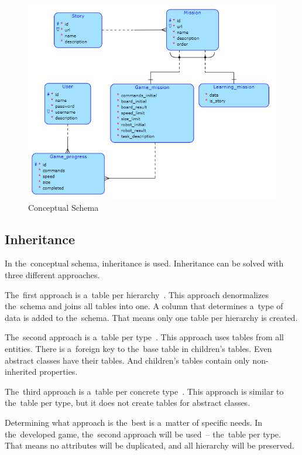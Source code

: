 \begin{figure}
    \centering
    \includegraphics[width=1\linewidth]{assets/design/conceptualdiagram.png}
    \caption{Conceptual Schema}
    \label{fig:design:conceptualschema}
\end{figure}

\subsection{Inheritance}

In the~conceptual schema, inheritance is used.
Inheritance can be solved with three different approaches.

The~first approach is a~table per hierarchy~\cite{a2010_enterprise}.
This approach denormalizes the~schema and joins all tables into one.
A column that determines a~type of data is added to the~schema.
That means only one table per hierarchy is created.

The~second approach is a~table per type~\cite{a2010_enterprise}.
This approach uses tables from all entities.
There is a~foreign key to the~base table in children's tables.
Even abstract classes have their tables.
And children's tables contain only non-inherited properties.

The~third approach is a~table per concrete type~\cite{a2010_enterprise}.
This approach is similar to the~table per type, but it does not create tables for abstract classes.

Determining what approach is the~best is a~matter of specific needs.
In the~developed game, the~second approach will be used~-- the~table per type.
That means no attributes will be duplicated, and all hierarchy will be preserved.
